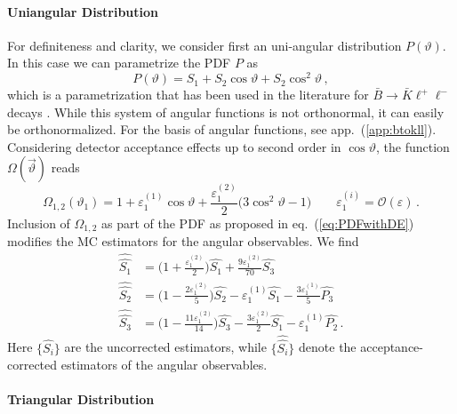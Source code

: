 \documentclass[aps,prd,reprint,nofootinbib,preprintnumbers]{revtex4}
\newcommand{\refapp}[1]{app.~(\ref{app:#1})}
\newcommand{\refeq}[1]{eq.~(\ref{eq:#1})}
\renewcommand{\theta}{\vartheta}
\newcommand{\order}[1]{\mathcal{O}\left({#1}\right)}
\let\eps\varepsilon
\newcommand{\est}[1]{\widehat{#1}}
\newcommand{\wwhat}[1]{\widehat{\widehat{#1}}}
\begin{document}
\paragraph{Uniangular Distribution}
For definiteness and clarity, we consider first an uni-angular distribution $P(\theta)$.
In this case we can parametrize the PDF $P$ as
\begin{equation}
    P(\theta) = S_1 + S_2 \cos\theta + S_2 \cos^2\theta\,,
\end{equation}
which is a parametrization that has been used in the literature for $\bar{B}\to\bar{K}\ell^+\ell^-$ decays \cite{Bobeth:2007dw}.
While this system of angular functions is not orthonormal, it can easily be orthonormalized. For the basis of angular
functions, see \refapp{btokll}.
Considering detector acceptance effects up to second order in $\cos\theta$, the function $\Omega(\vec\theta)$ reads
\begin{equation}
    \Omega_{1,2}(\theta_1) = 1 + \eps_{1}^{(1)} \cos\theta + \frac{\eps_{1}^{(2)}}{2}\big(3 \cos^2\theta - 1\big)\qquad\eps_{1}^{(i)} = \order{\eps}\,.
\end{equation}
Inclusion of $\Omega_{1,2}$ as part of the PDF as proposed in \refeq{PDFwithDE} modifies the MC estimators for the angular observables.
We find
\begin{equation}
\begin{aligned}
    \wwhat{S_1} & = \Big(1 + \frac{\eps_{1}^{(2)}}{2}\Big) \est{S_1} + \frac{9 \eps_{1}^{(2)}}{70} \est{S_3}\\
    \wwhat{S_2} & = \Big(1 - \frac{2 \eps_{1}^{(2)}}{5}\Big) \est{S_2} - \eps_{1}^{(1)} \est{S_1} - \frac{3\eps_{1}^{(1)}}{5} \est{P_3}\\
    \wwhat{S_3} & = \Big(1 - \frac{11\eps_{1}^{(2)}}{14}\Big)\est{S_3} - \frac{3\eps_{1}^{(2)}}{2} \est{S_1} - \eps_{1}^{(1)} \est{P_2}\,.
\end{aligned}
\end{equation}
Here $\lbrace \est{S_i}\rbrace$ are the uncorrected estimators, while $\lbrace \wwhat{S_i}\rbrace$ denote the
acceptance-corrected estimators of the angular observables.\\

\paragraph{Triangular Distribution}

\begin{table}
    \resizebox{.99\textwidth}{!}{\ensuremath{}}\\[2.5\medskipamount]
    \resizebox{.99\textwidth}{!}{\ensuremath{}}\\[2.5\medskipamount]
    \resizebox{.99\textwidth}{!}{\ensuremath{}}
    \caption{The matrix $N_{ij}$ that appears in \refeq{eff-corrected-est-btokstarll}. Due to spatial
        constraints, we split its display into columns $j=1s,1c,1i,2s,2c,2i$ (top),
        $j=3,4,4i,5,5i,6s$ (middle) and $j=6c,7,7i,8,8i,9$ (bottom).
        \label{tab:eff-corrected-est-btokstarll}
    }
\end{table}
\end{document}
